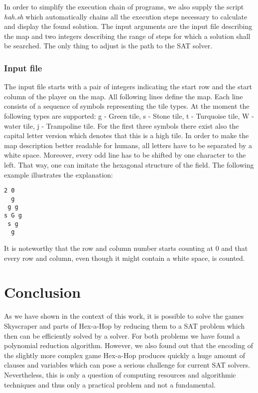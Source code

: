 \documentclass[a4paper, 12pt, titlepage]{article}
\begin{document}
In order to simplify the execution chain of programs, we also supply the script \emph{hah.sh} which automatically chains all the execution steps necessary to calculate and display the found solution. The input arguments are the input file describing the map and two integers describing the range of steps for which a solution shall be searched. The only thing to adjust is the path to the SAT solver.

\subsubsection{Input file}

The input file starts with a pair of integers indicating the start row and the start column of the player on the map. 
All following lines define the map. 
Each line consists of a sequence of symbols representing the tile types. 
At the moment the following types are supported: \pmb g - Green tile, \pmb s - Stone tile, \pmb t - Turquoise tile, \pmb W - water tile, \pmb j - Trampoline tile. 
For the first three symbols there exist also the capital letter version which denotes that this is a high tile. 
In order to make the map description better readable for humans, all letters have to be separated by a white space. 
Moreover, every odd line has to be shifted by one character to the left. 
That way, one can imitate the hexagonal structure of the field. 
The following example illustrates the explanation:
\begin{verbatim}
2 0
  g
 g g
s G g
 s g
  g	
\end{verbatim}
It is noteworthy that the row and column number starts counting at 0 and that every row and column, even though it might contain a white space, is counted.


\section{Conclusion}

As we have shown in the context of this work, it is possible to solve the games Skyscraper and parts of Hex-a-Hop by reducing them to a SAT problem which then can be efficiently solved by a solver. 
For both problems we have found a polynomial reduction algorithm.
However, we also found out that the encoding of the slightly more complex game Hex-a-Hop produces quickly a huge amount of clauses and variables which can pose a serious challenge for current SAT solvers.
Nevertheless, this is only a question of computing resources and algorithmic techniques and thus only a practical problem and not a fundamental.
\end{document}
